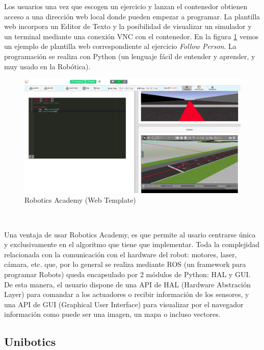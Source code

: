 Los usuarios una vez que escogen un ejercicio y lanzan el contenedor obtienen acceso a una dirección web local donde pueden empezar a programar. La plantilla web incorpora un Editor de Texto y la posibilidad de visualizar un simulador y un terminal mediante una conexión VNC con el contenedor. En la figura \ref{fig:rob-ac-web-template} vemos un ejemplo de plantilla web correspondiente al ejercicio \textit{Follow Person}. La programación se realiza con Python (un lenguaje fácil de entender y aprender, y muy usado en la Robótica).\\

\begin{figure} [h!]
  \begin{center}
    \includegraphics[width=12cm]{imagenes/cap1/robotics-academy-web-template.png}
  \end{center}
  \caption[Robotics Academy (Web Template)]{Robotics Academy (Web Template)}
  \label{fig:rob-ac-web-template}
\end{figure}\

Una ventaja de usar Robotics Academy, es que permite al usario centrarse única y exclusivamente en el algoritmo que tiene que implementar. Toda la complejidad relacionada con la comunicación con el hardware del robot: motores, laser, cámara, etc. que, por lo general se realiza mediante ROS (un framework para programar Robots) queda encapsulado por 2 módulos de Python: HAL y GUI. De esta manera, el usuario dispone de una API de HAL (Hardware Abstración Layer) para comandar a los actuadores o recibir información de los sensores, y una API de GUI (Graphical User Interface) para visualizar por el navegador información como puede ser una imagen, un mapa o incluso vectores.\\

\subsection{Unibotics}
\label{sec:unibotics}

